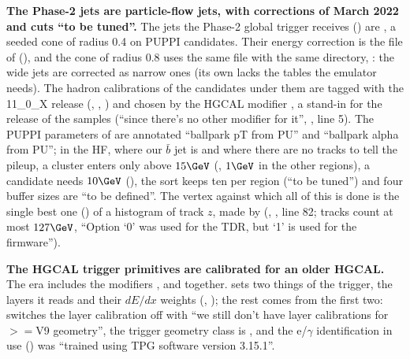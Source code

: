 \textbf{The Phase-2 jets are particle-flow jets, with corrections of March 2022 and cuts ``to be tuned''.} The jets the
Phase-2 global trigger receives () are
, a seeded cone of radius 0.4 on PUPPI candidates. Their energy correction is
the file  of  (), and
the cone of radius 0.8 uses the same file with the same directory, : the wide jets are
corrected as narrow ones (its own  lacks the  tables the emulator needs).
The hadron calibrations of the candidates under them are tagged with the 11\_0\_X release
(, , ) and chosen by the
HGCAL modifier , a stand-in for the release of the samples (``since there's no other modifier
for it'', , line 5). The PUPPI parameters of  are
annotated ``ballpark pT from PU'' and ``ballpark alpha from PU''; in the HF, where our $\bar b$ jet is and where there
are no tracks to tell the pileup, a cluster enters only above $15\GeV$ (, $1\GeV$ in the other regions),
a candidate needs $10\GeV$ (), the sort keeps ten per region (``to be tuned'') and four buffer sizes are
``to be defined''. The vertex against which all of this is done is the single best one () of a
histogram of track $z$, made by  (,
, line 82; tracks count at most $127\GeV$, ``Option `0'
was used for the TDR, but `1' is used for the firmware'').

\textbf{The HGCAL trigger primitives are calibrated for an older HGCAL.} The era includes the modifiers
,  and  together.  sets two things of the trigger, the layers it
reads and their $dE/dx$ weights (,
); the rest comes from the first two:
 switches the layer calibration off with ``we
still don't have layer calibrations for $>=$V9 geometry'', the trigger geometry class is
, and the e/$\gamma$ identification in use () was ``trained using TPG
software version 3.15.1''.

